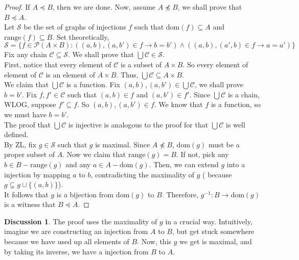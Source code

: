 \documentclass[14pt]{article}
\theoremstyle{definition}
\newtheorem*{discussion}{Discussion}
\newcommand{\fun}[3]{#1\colon #2\rightarrow#3}
\begin{document}
\begin{proof}
    If $A\preceq B$, then we are done.  Now, assume $A\not\preceq B$, we shall prove 
    that $B\preceq A$.\\
    Let $\mathcal{S}$ be the set of graphs of injections $f$ 
    such that $\mathrm{dom}(f)\subseteq A$ and $\mathrm{range}(f)\subseteq B$. Set 
    theoretically,
    \begin{equation*}
        \mathcal{S}=\{f\in \mathcal{P}(A\times B)\colon ((a,b), (a,b')\in f\to b=b')
        \wedge ((a,b),(a',b)\in f\to a=a')\}
    \end{equation*}
    Fix any chain $\mathcal{C}\subseteq \mathcal{S}$. We shall prove that $\bigcup 
    \mathcal{C}\in \mathcal{S}$.\\
    First, notice that every element of $\mathcal{C}$ is a subset of $A\times B$. So
    every element of element of $\mathcal{C}$ is an element of $A\times B$. Thus, 
    $\bigcup \mathcal{C} \subseteq A\times B$.\\
    We claim that $\bigcup \mathcal{C}$ is a function. Fix $(a,b), (a,b')\in\bigcup \mathcal{C}$,
    we shall prove $b=b'$. Fix $f, f'\in  \mathcal{C}$ such that $(a,b)\in f$ and 
    $(a,b')\in f'$. Since $\bigcup \mathcal{C}$ is a chain, WLOG, suppose $f'\subseteq f$.
    So $(a,b), (a,b')\in f$. We know that $f$ is a function, so we must have $b=b'$.\\
    The proof that $\bigcup \mathcal{C}$ is injective is analogous to the proof for that 
    $\bigcup \mathcal{C}$ is well defined.\\
    By ZL, fix $g\in \mathcal{S}$ such that $g$ is maximal. Since $A\not\preceq B$, 
     $\mathrm{dom}(g)$ must be a proper subset of $A$. Now we claim that $\mathrm{range}(g)
     =B$. If not, pick any $b\in B-\mathrm{range} (g)$ and any $a\in A-\mathrm{dom}(g)$. 
     Then, we can extend $g$ into a injection by mapping $a$ to $b$, contradicting the 
     maximality of $g$ ( because $g\subsetneq g\cup \{(a,b)\}$).\\
     It follows that $g$ is a bijection from $\mathrm{dom}(g)$ to $B$. Therefore, 
     $\fun{g^{-1}}{B}{\mathrm{dom}(g)}$ is a witness that $B\preceq A$.

\end{proof}

\begin{discussion}
    The proof uses the maximality of $g$ in a crucial way. Intuitively, imagine we are 
    constructing an injection from $A$ to $B$, but get stuck somewhere because we have used
    up all elements of $B$. Now, this $g$ we get is maximal, and by taking its inverse, we
    have a injection from $B$ to $A$. 
\end{discussion}
\end{document}
